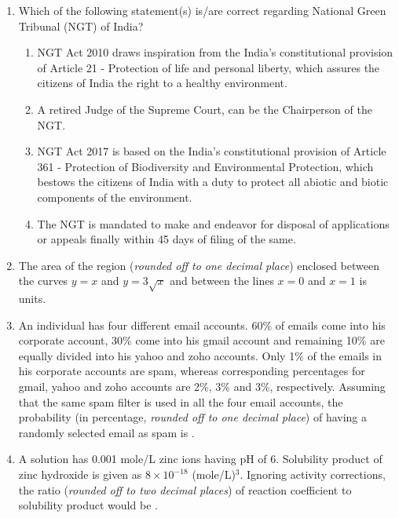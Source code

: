 \documentclass[12pt,a4paper]{article}
\begin{document}
\begin{enumerate}
   \item Which of the following statement(s) is/are correct regarding National Green Tribunal (NGT) of India?
         \begin{enumerate}
            \item NGT Act 2010 draws inspiration from the India's constitutional provision of Article 21 - Protection of life and personal liberty, which assures the citizens of India the right to a healthy environment.
            \item A retired Judge of the Supreme Court, can be the Chairperson of the NGT.
            \item NGT Act 2017 is based on the India's constitutional provision of Article 361 - Protection of Biodiversity and Environmental Protection, which bestows the citizens of India with a duty to protect all abiotic and biotic components of the environment.
            \item The NGT is mandated to make and endeavor for disposal of applications or appeals finally within 45 days of filing of the same.
         \end{enumerate}

   \item The area of the region (\textit{rounded off to one decimal place}) enclosed between the curves $y = x$ and $y = 3\sqrt{x}$ and between the lines $x = 0$ and $x = 1$ is \underline{\hspace{2cm}} units.

   \item An individual has four different email accounts. 60\% of emails come into his corporate account, 30\% come into his gmail account and remaining 10\% are equally divided into his yahoo and zoho accounts. Only 1\% of the emails in his corporate accounts are spam, whereas corresponding percentages for gmail, yahoo and zoho accounts are 2\%, 3\% and 3\%, respectively. Assuming that the same spam filter is used in all the four email accounts, the probability (in percentage, \textit{rounded off to one decimal place}) of having a randomly selected email as spam is \underline{\hspace{2cm}}.

   \item A solution has 0.001 mole/L zinc ions having pH of 6. Solubility product of zinc hydroxide is given as $8 \times 10^{-18}$ (mole/L)$^3$. Ignoring activity corrections, the ratio (\textit{rounded off to two decimal places}) of reaction coefficient to solubility product would be \underline{\hspace{2cm}}.


\end{enumerate}
\end{document}
